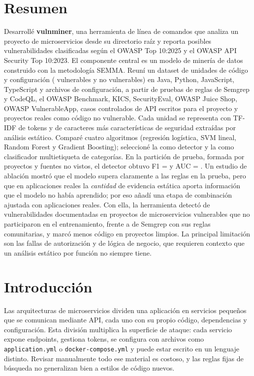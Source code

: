 \documentclass[12pt,a4paper]{article}
\newcommand{\cod}[1]{\texttt{#1}}
\begin{document}
\section*{Resumen}
Desarrollé \textbf{vulnminer}, una herramienta de línea de comandos que analiza un proyecto de microservicios desde su directorio raíz y reporta posibles vulnerabilidades clasificadas según el OWASP Top 10:2025 y el OWASP API Security Top 10:2023. El componente central es un modelo de minería de datos construido con la metodología SEMMA. Reuní un dataset de \nUnidades{} unidades de código y configuración (\nVulnerables{} vulnerables y \nSeguras{} no vulnerables) en Java, Python, JavaScript, TypeScript y archivos de configuración, a partir de pruebas de reglas de Semgrep y CodeQL, el OWASP Benchmark, KICS, SecurityEval, OWASP Juice Shop, OWASP VulnerableApp, casos controlados de API escritos para el proyecto y \nBenignos{} proyectos reales como código no vulnerable. Cada unidad se representa con TF-IDF de tokens y de caracteres más \nCaracteristicas{} características de seguridad extraídas por análisis estático. Comparé cuatro algoritmos (regresión logística, SVM lineal, Random Forest y Gradient Boosting); seleccioné la \detAlgoritmo{} como detector y la \catAlgoritmo{} como clasificador multietiqueta de categorías. En la partición de prueba, formada por proyectos y fuentes no vistos, el detector obtuvo F1 = \pruebaFUno{} y AUC = \pruebaAUC{}. Un estudio de ablación mostró que el modelo supera claramente a las reglas en la prueba, pero que en aplicaciones reales la \emph{cantidad} de evidencia estática aporta información que el modelo no había aprendido; por eso añadí una etapa de combinación ajustada con aplicaciones reales. Con ella, la herramienta detectó \extDetectadas{} de \extDocumentadas{} vulnerabilidades documentadas en \nProyectosVulnerables{} proyectos de microservicios vulnerables que no participaron en el entrenamiento, frente a \sgDetectadas{} de Semgrep con sus reglas comunitarias, y marcó menos código en proyectos limpios. La principal limitación son las fallas de autorización y de lógica de negocio, que requieren contexto que un análisis estático por función no siempre tiene.

\tableofcontents
\newpage

\section{Introducción}
Las arquitecturas de microservicios dividen una aplicación en servicios pequeños que se comunican mediante API, cada uno con su propio código, dependencias y configuración. Esta división multiplica la superficie de ataque: cada servicio expone endpoints, gestiona tokens, se configura con archivos como \cod{application.yml} o \cod{docker-compose.yml} y puede estar escrito en un lenguaje distinto. Revisar manualmente todo ese material es costoso, y las reglas fijas de búsqueda no generalizan bien a estilos de código nuevos.
\end{document}
